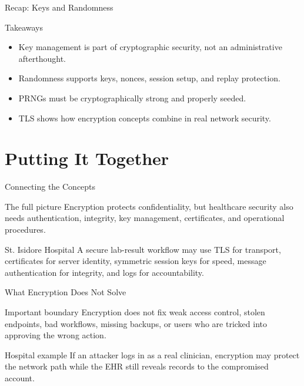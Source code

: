 \documentclass[presentation]{beamer}
\begin{document}
\begin{frame}[c]{Recap: Keys and Randomness}
\begin{block}{Takeaways}
\begin{itemize}
    \item Key management is part of cryptographic security, not an administrative afterthought.
    \item Randomness supports keys, nonces, session setup, and replay protection.
    \item PRNGs must be cryptographically strong and properly seeded.
    \item TLS shows how encryption concepts combine in real network security.
\end{itemize}
\end{block}
\end{frame}

\section{Putting It Together}

\begin{frame}[c]{Connecting the Concepts}
\begin{block}{The full picture}
Encryption protects confidentiality, but healthcare security also needs authentication, integrity,
key management, certificates, and operational procedures.
\end{block}

\begin{exampleblock}{St. Isidore Hospital}
A secure lab-result workflow may use TLS for transport, certificates for server identity, symmetric
session keys for speed, message authentication for integrity, and logs for accountability.
\end{exampleblock}
\end{frame}

\begin{frame}[c]{What Encryption Does Not Solve}
\begin{block}{Important boundary}
Encryption does not fix weak access control, stolen endpoints, bad workflows, missing backups, or
users who are tricked into approving the wrong action.
\end{block}

\begin{exampleblock}{Hospital example}
If an attacker logs in as a real clinician, encryption may protect the network path while the EHR
still reveals records to the compromised account.
\end{exampleblock}
\end{frame}
\end{document}
